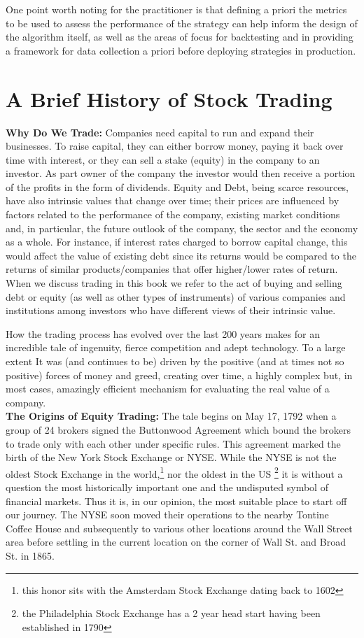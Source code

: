 One point worth noting for the practitioner is that defining a priori the metrics to be used to assess the performance of the strategy can help inform the design of the algorithm itself, as well as the areas of focus for backtesting and in providing a framework for data collection a priori before deploying strategies in production. 



\section{A Brief History of Stock Trading}

\noindent\textbf{Why Do We Trade:} Companies need capital to run and expand their businesses. To raise capital, they can either borrow money, paying it back over time with interest, or they can sell a stake (equity) in the company to an investor. As part owner of the company the investor would then receive a portion of the profits in the form of dividends. Equity and Debt, being scarce resources, have also intrinsic values that change over time; their prices are influenced by factors related to the performance of the company, existing market conditions and, in particular, the future outlook of the company, the sector and the economy as a whole. For instance, if interest rates charged to borrow capital change, this would affect the value of existing debt since its returns would be compared to the returns of similar products/companies that offer higher/lower rates of return. When we discuss trading in this book we refer to the act of buying and selling debt or equity (as well as other types of instruments) of various companies and institutions among investors who have different views of their intrinsic value.


How the trading process has evolved over the last 200 years makes for an incredible tale of ingenuity, fierce competition and adept technology. To a large extent It was (and continues to be) driven by the positive (and at times not so positive) forces of money and greed, creating over time, a highly complex but, in most cases, amazingly efficient mechanism for evaluating the real value of a company. \\


\noindent\textbf{The Origins of Equity Trading:} The tale begins on May 17, 1792 when a group of 24 brokers signed the Buttonwood Agreement which bound the brokers to trade only with each other under specific rules. This agreement marked the birth of the New York Stock Exchange or NYSE. While the NYSE is not the oldest Stock Exchange in the world,\footnote{this honor sits with the Amsterdam Stock Exchange dating back to 1602} nor the oldest in the US \footnote{the Philadelphia Stock Exchange has a 2 year head start having been established in 1790} it is without a question the most historically important one and the undisputed symbol of financial markets. Thus it is, in our opinion, the most suitable place to start off our journey. The NYSE soon moved their operations to the nearby Tontine Coffee House and subsequently to various other locations around the Wall Street area before settling in the current location on the corner of Wall St. and Broad St. in 1865. \\



